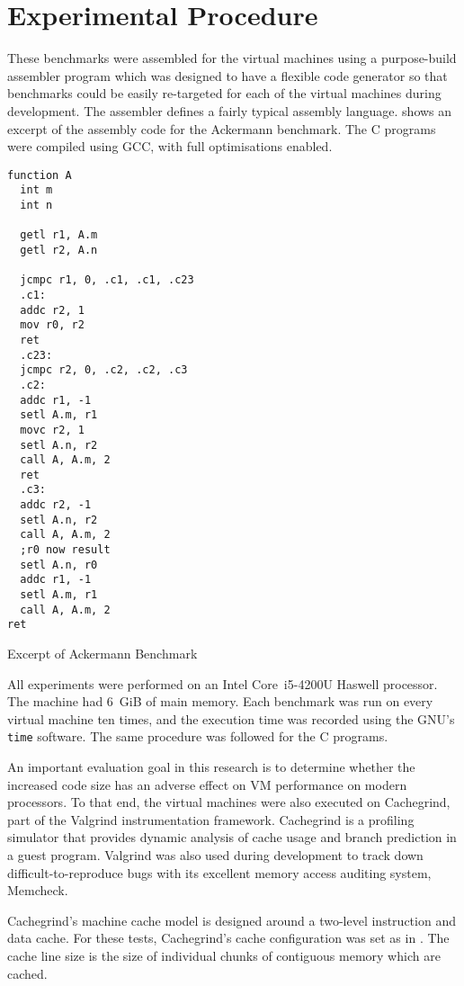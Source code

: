 	\section{Experimental Procedure}
	These benchmarks were assembled for the virtual machines using a purpose-build assembler program which was designed to have a flexible code generator so that benchmarks could be easily re-targeted for each of the virtual machines during development. The assembler defines a fairly typical assembly language.  shows an excerpt of the assembly code for the Ackermann benchmark. The C programs were compiled using GCC, with full optimisations enabled.
	
	\begin{myfigure}
		\begin{lstlisting}
function A
  int m
  int n

  getl r1, A.m
  getl r2, A.n

  jcmpc r1, 0, .c1, .c1, .c23
  .c1:
  addc r2, 1
  mov r0, r2
  ret
  .c23:
  jcmpc r2, 0, .c2, .c2, .c3
  .c2:
  addc r1, -1
  setl A.m, r1
  movc r2, 1
  setl A.n, r2
  call A, A.m, 2
  ret
  .c3:
  addc r2, -1
  setl A.n, r2
  call A, A.m, 2
  ;r0 now result
  setl A.n, r0
  addc r1, -1
  setl A.m, r1
  call A, A.m, 2
ret
		\end{lstlisting}
		\caption{Excerpt of Ackermann Benchmark}
		\label{fig:ackermann}
	\end{myfigure}
	
		All experiments were performed on an Intel Core~i5-4200U Haswell processor. The machine had 6~GiB of main memory. Each benchmark was run on every virtual machine ten times, and the execution time was recorded using the GNU's \texttt{time} software. The same procedure was followed for the C programs. 
		
		An important evaluation goal in this research is to determine whether the increased code size has an adverse effect on VM performance on modern processors. To that end, the virtual machines were also executed on Cachegrind, part of the Valgrind instrumentation framework. Cachegrind is a profiling simulator that provides dynamic analysis of cache usage and branch prediction in a guest program. Valgrind was also used during development to track down difficult-to-reproduce bugs with its excellent memory access auditing system, Memcheck.
		
		Cachegrind's machine cache model is designed around a two-level instruction and data cache. For these tests, Cachegrind's cache configuration was set as in . The cache line size is the size of individual chunks of contiguous memory which are cached.
		
